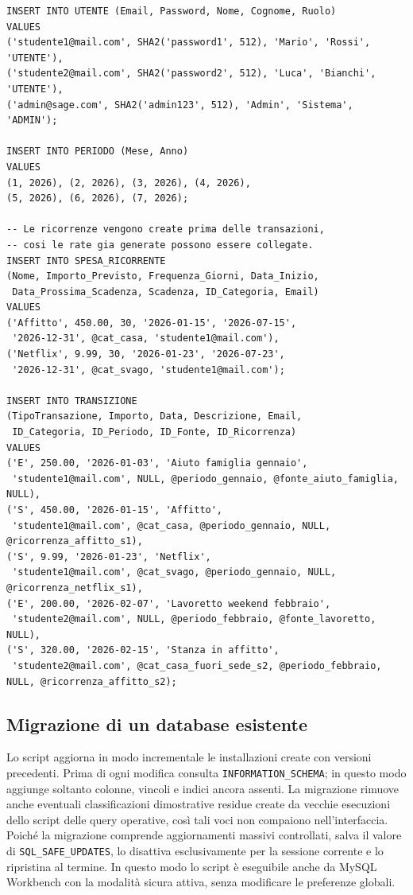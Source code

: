 \documentclass[11pt,a4paper]{article}
\begin{document}
\begin{lstlisting}[caption={Estratto del popolamento esteso con due utenti e movimenti distribuiti nel tempo}]
INSERT INTO UTENTE (Email, Password, Nome, Cognome, Ruolo)
VALUES
('studente1@mail.com', SHA2('password1', 512), 'Mario', 'Rossi', 'UTENTE'),
('studente2@mail.com', SHA2('password2', 512), 'Luca', 'Bianchi', 'UTENTE'),
('admin@sage.com', SHA2('admin123', 512), 'Admin', 'Sistema', 'ADMIN');

INSERT INTO PERIODO (Mese, Anno)
VALUES
(1, 2026), (2, 2026), (3, 2026), (4, 2026),
(5, 2026), (6, 2026), (7, 2026);

-- Le ricorrenze vengono create prima delle transazioni,
-- cosi le rate gia generate possono essere collegate.
INSERT INTO SPESA_RICORRENTE
(Nome, Importo_Previsto, Frequenza_Giorni, Data_Inizio,
 Data_Prossima_Scadenza, Scadenza, ID_Categoria, Email)
VALUES
('Affitto', 450.00, 30, '2026-01-15', '2026-07-15',
 '2026-12-31', @cat_casa, 'studente1@mail.com'),
('Netflix', 9.99, 30, '2026-01-23', '2026-07-23',
 '2026-12-31', @cat_svago, 'studente1@mail.com');

INSERT INTO TRANSIZIONE
(TipoTransazione, Importo, Data, Descrizione, Email,
 ID_Categoria, ID_Periodo, ID_Fonte, ID_Ricorrenza)
VALUES
('E', 250.00, '2026-01-03', 'Aiuto famiglia gennaio',
 'studente1@mail.com', NULL, @periodo_gennaio, @fonte_aiuto_famiglia, NULL),
('S', 450.00, '2026-01-15', 'Affitto',
 'studente1@mail.com', @cat_casa, @periodo_gennaio, NULL, @ricorrenza_affitto_s1),
('S', 9.99, '2026-01-23', 'Netflix',
 'studente1@mail.com', @cat_svago, @periodo_gennaio, NULL, @ricorrenza_netflix_s1),
('E', 200.00, '2026-02-07', 'Lavoretto weekend febbraio',
 'studente2@mail.com', NULL, @periodo_febbraio, @fonte_lavoretto, NULL),
('S', 320.00, '2026-02-15', 'Stanza in affitto',
 'studente2@mail.com', @cat_casa_fuori_sede_s2, @periodo_febbraio, NULL, @ricorrenza_affitto_s2);
\end{lstlisting}

\subsection{Migrazione di un database esistente}
Lo script  aggiorna in modo incrementale le installazioni create con versioni precedenti. Prima di ogni modifica consulta \texttt{INFORMATION\_SCHEMA}; in questo modo aggiunge soltanto colonne, vincoli e indici ancora assenti. La migrazione rimuove anche eventuali classificazioni dimostrative residue create da vecchie esecuzioni dello script delle query operative, così tali voci non compaiono nell'interfaccia. Poiché la migrazione comprende aggiornamenti massivi controllati, salva il valore di \texttt{SQL\_SAFE\_UPDATES}, lo disattiva esclusivamente per la sessione corrente e lo ripristina al termine. In questo modo lo script è eseguibile anche da MySQL Workbench con la modalità sicura attiva, senza modificare le preferenze globali.
\end{document}
